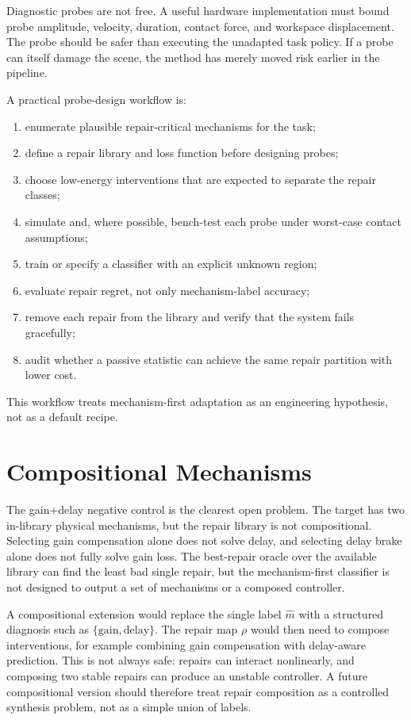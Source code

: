 \documentclass{article}
\begin{document}
Diagnostic probes are not free. A useful hardware implementation must bound
probe amplitude, velocity, duration, contact force, and workspace displacement.
The probe should be safer than executing the unadapted task policy. If a probe
can itself damage the scene, the method has merely moved risk earlier in the
pipeline.

A practical probe-design workflow is:
\begin{enumerate}
    \item enumerate plausible repair-critical mechanisms for the task;
    \item define a repair library and loss function before designing probes;
    \item choose low-energy interventions that are expected to separate the
    repair classes;
    \item simulate and, where possible, bench-test each probe under worst-case
    contact assumptions;
    \item train or specify a classifier with an explicit unknown region;
    \item evaluate repair regret, not only mechanism-label accuracy;
    \item remove each repair from the library and verify that the system fails
    gracefully;
    \item audit whether a passive statistic can achieve the same repair
    partition with lower cost.
\end{enumerate}
This workflow treats mechanism-first adaptation as an engineering hypothesis,
not as a default recipe.

\section{Compositional Mechanisms}

The gain+delay negative control is the clearest open problem. The target has two
in-library physical mechanisms, but the repair library is not compositional.
Selecting gain compensation alone does not solve delay, and selecting delay
brake alone does not fully solve gain loss. The best-repair oracle over the
available library can find the least bad single repair, but the mechanism-first
classifier is not designed to output a set of mechanisms or a composed
controller.

A compositional extension would replace the single label $\hat{m}$ with a
structured diagnosis such as $\{\mathrm{gain},\mathrm{delay}\}$. The repair map
$\rho$ would then need to compose interventions, for example combining gain
compensation with delay-aware prediction. This is not always safe: repairs can
interact nonlinearly, and composing two stable repairs can produce an unstable
controller. A future compositional version should therefore treat repair
composition as a controlled synthesis problem, not as a simple union of labels.
\end{document}
